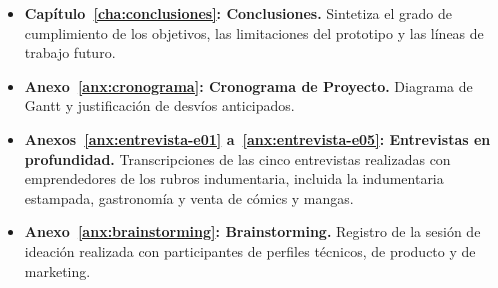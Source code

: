 \begin{itemize}
    \item \textbf{Capítulo~\ref{cha:conclusiones}: Conclusiones.} Sintetiza el grado de cumplimiento de los objetivos, las limitaciones del prototipo y las líneas de trabajo futuro.
    \item \textbf{Anexo~\ref{anx:cronograma}: Cronograma de Proyecto.} Diagrama de Gantt y justificación de desvíos anticipados.
    \item \textbf{Anexos~\ref{anx:entrevista-e01} a~\ref{anx:entrevista-e05}: Entrevistas en profundidad.} Transcripciones de las cinco entrevistas realizadas con emprendedores de los rubros indumentaria, incluida la indumentaria estampada, gastronomía y venta de cómics y mangas.
    \item \textbf{Anexo~\ref{anx:brainstorming}: Brainstorming.} Registro de la sesión de ideación realizada con participantes de perfiles técnicos, de producto y de marketing.
\end{itemize}
